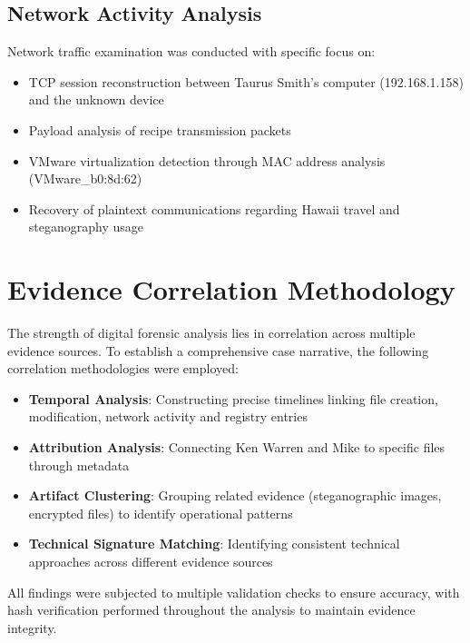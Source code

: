 \subsection{Network Activity Analysis}
Network traffic examination was conducted with specific focus on:

\begin{itemize}
    \item TCP session reconstruction between Taurus Smith's computer (192.168.1.158) and the unknown device
    \item Payload analysis of recipe transmission packets
    \item VMware virtualization detection through MAC address analysis (VMware\_b0:8d:62)
    \item Recovery of plaintext communications regarding Hawaii travel and steganography usage
\end{itemize}

\section{Evidence Correlation Methodology}

The strength of digital forensic analysis lies in correlation across multiple evidence sources. To establish a comprehensive case narrative, the following correlation methodologies were employed:

\begin{itemize}
    \item \textbf{Temporal Analysis}: Constructing precise timelines linking file creation, modification, network activity and registry entries
    \item \textbf{Attribution Analysis}: Connecting Ken Warren and Mike to specific files through metadata
    \item \textbf{Artifact Clustering}: Grouping related evidence (steganographic images, encrypted files) to identify operational patterns
    \item \textbf{Technical Signature Matching}: Identifying consistent technical approaches across different evidence sources
\end{itemize}

All findings were subjected to multiple validation checks to ensure accuracy, with hash verification performed throughout the analysis to maintain evidence integrity.